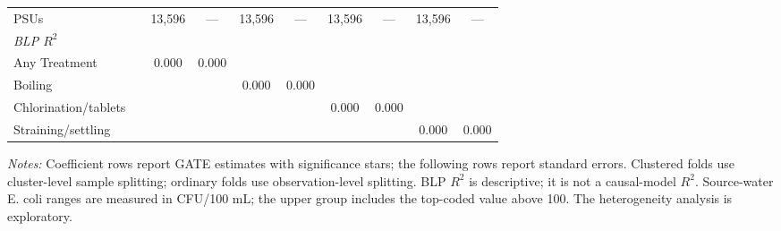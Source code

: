 \begin{landscape}
\begin{table}[p]
\begin{adjustbox}{max width=\linewidth, center}
\begin{tabular}{llcccccccc}
\quad PSUs &  & 13,596 & --- & 13,596 & --- & 13,596 & --- & 13,596 & --- \\
\multicolumn{10}{l}{\textit{BLP $R^{2}$}} \\
\quad Any Treatment &  & 0.000 & 0.000 &  &  &  &  &  &  \\
\quad Boiling &  &  &  & 0.000 & 0.000 &  &  &  &  \\
\quad Chlorination/tablets &  &  &  &  &  & 0.000 & 0.000 &  &  \\
\quad Straining/settling &  &  &  &  &  &  &  & 0.000 & 0.000 \\
\bottomrule
\end{tabular}
\end{adjustbox}
\par\vspace{3pt}
\begin{minipage}{\linewidth}\footnotesize \textit{Notes:} Coefficient rows report GATE estimates with significance stars; the following rows report standard errors. Clustered folds use cluster-level sample splitting; ordinary folds use observation-level splitting. BLP $R^2$ is descriptive; it is not a causal-model $R^2$. Source-water E. coli ranges are measured in CFU/100 mL; the upper group includes the top-coded value above 100. The heterogeneity analysis is exploratory.\end{minipage}
\end{table}
\end{landscape}
